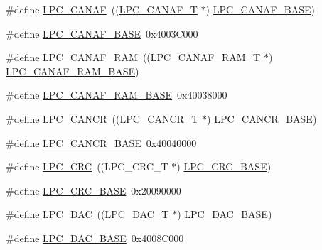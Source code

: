\begin{DoxyCompactItemize}
\#define \hyperlink{group__PERIPH__177X__8X__BASE_ga4f738c971938302f38d54e662c9f7774}{L\+P\+C\+\_\+\+C\+A\+N\+AF}~((\hyperlink{structLPC__CANAF__T}{L\+P\+C\+\_\+\+C\+A\+N\+A\+F\+\_\+T}            $\ast$) \hyperlink{group__PERIPH__407X__8X__BASE_gabc6943f9e943d63ecf4e236b4ce7c344}{L\+P\+C\+\_\+\+C\+A\+N\+A\+F\+\_\+\+B\+A\+SE})
\item 
\#define \hyperlink{group__PERIPH__177X__8X__BASE_gabc6943f9e943d63ecf4e236b4ce7c344}{L\+P\+C\+\_\+\+C\+A\+N\+A\+F\+\_\+\+B\+A\+SE}~0x4003\+C000
\item 
\#define \hyperlink{group__PERIPH__177X__8X__BASE_gaf02b7bcdc41a045910b3f0bae8a8f4b0}{L\+P\+C\+\_\+\+C\+A\+N\+A\+F\+\_\+\+R\+AM}~((\hyperlink{structLPC__CANAF__RAM__T}{L\+P\+C\+\_\+\+C\+A\+N\+A\+F\+\_\+\+R\+A\+M\+\_\+T}        $\ast$) \hyperlink{group__PERIPH__407X__8X__BASE_ga9d4f2bac61e26b32ad64d62f2be50e49}{L\+P\+C\+\_\+\+C\+A\+N\+A\+F\+\_\+\+R\+A\+M\+\_\+\+B\+A\+SE})
\item 
\#define \hyperlink{group__PERIPH__177X__8X__BASE_ga9d4f2bac61e26b32ad64d62f2be50e49}{L\+P\+C\+\_\+\+C\+A\+N\+A\+F\+\_\+\+R\+A\+M\+\_\+\+B\+A\+SE}~0x40038000
\item 
\#define \hyperlink{group__PERIPH__177X__8X__BASE_gadc209557a5736e29149b96018056fc29}{L\+P\+C\+\_\+\+C\+A\+N\+CR}~((L\+P\+C\+\_\+\+C\+A\+N\+C\+R\+\_\+T            $\ast$) \hyperlink{group__PERIPH__407X__8X__BASE_gac22b88e108d620661add143c174f8f11}{L\+P\+C\+\_\+\+C\+A\+N\+C\+R\+\_\+\+B\+A\+SE})
\item 
\#define \hyperlink{group__PERIPH__177X__8X__BASE_gac22b88e108d620661add143c174f8f11}{L\+P\+C\+\_\+\+C\+A\+N\+C\+R\+\_\+\+B\+A\+SE}~0x40040000
\item 
\#define \hyperlink{group__PERIPH__177X__8X__BASE_gaf01f4835164b4abd2dcc9d89a66ffc21}{L\+P\+C\+\_\+\+C\+RC}~((L\+P\+C\+\_\+\+C\+R\+C\+\_\+T              $\ast$) \hyperlink{group__PERIPH__407X__8X__BASE_ga6d27804148d49c67065a8cd351ebc7b7}{L\+P\+C\+\_\+\+C\+R\+C\+\_\+\+B\+A\+SE})
\item 
\#define \hyperlink{group__PERIPH__177X__8X__BASE_ga6d27804148d49c67065a8cd351ebc7b7}{L\+P\+C\+\_\+\+C\+R\+C\+\_\+\+B\+A\+SE}~0x20090000
\item 
\#define \hyperlink{group__PERIPH__177X__8X__BASE_ga5b94918e9ea326d84ab862a5d377903b}{L\+P\+C\+\_\+\+D\+AC}~((\hyperlink{structLPC__DAC__T}{L\+P\+C\+\_\+\+D\+A\+C\+\_\+T}              $\ast$) \hyperlink{group__PERIPH__407X__8X__BASE_ga3bbaedad584252212d4704bb419489f6}{L\+P\+C\+\_\+\+D\+A\+C\+\_\+\+B\+A\+SE})
\item 
\#define \hyperlink{group__PERIPH__177X__8X__BASE_ga3bbaedad584252212d4704bb419489f6}{L\+P\+C\+\_\+\+D\+A\+C\+\_\+\+B\+A\+SE}~0x4008\+C000

\end{DoxyCompactItemize}
